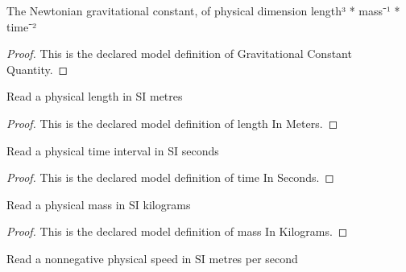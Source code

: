 \begin{definition}
  \label{def:physics:phyx-mini-0514:phyxminiproblems-problemphyxmini0514-gravitationalconstantquantity}
  The Newtonian gravitational constant, of physical dimension length³ * mass⁻¹ * time⁻²
\end{definition}
\begin{proof}
  This is the declared model definition of Gravitational Constant Quantity.
\end{proof}
\begin{definition}
  \label{def:physics:phyx-mini-0514:phyxminiproblems-problemphyxmini0514-lengthinmeters}
  Read a physical length in SI metres
\end{definition}
\begin{proof}
  This is the declared model definition of length In Meters.
\end{proof}
\begin{definition}
  \label{def:physics:phyx-mini-0514:phyxminiproblems-problemphyxmini0514-timeinseconds}
  Read a physical time interval in SI seconds
\end{definition}
\begin{proof}
  This is the declared model definition of time In Seconds.
\end{proof}
\begin{definition}
  \label{def:physics:phyx-mini-0514:phyxminiproblems-problemphyxmini0514-massinkilograms}
  Read a physical mass in SI kilograms
\end{definition}
\begin{proof}
  This is the declared model definition of mass In Kilograms.
\end{proof}
\begin{definition}
  \label{def:physics:phyx-mini-0514:phyxminiproblems-problemphyxmini0514-speedinmeterspersecond}
  Read a nonnegative physical speed in SI metres per second
\end{definition}

